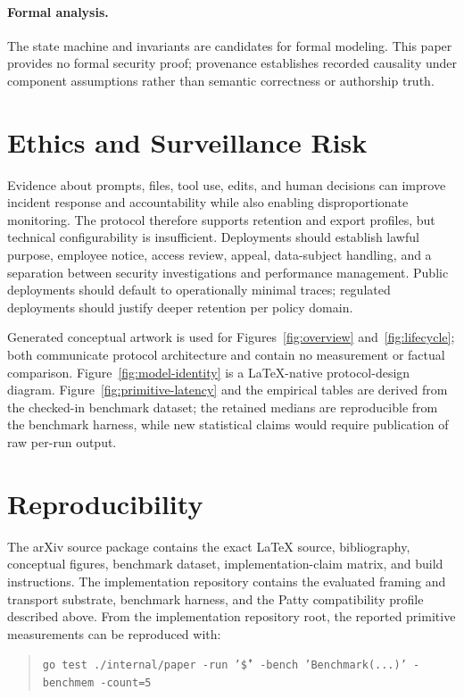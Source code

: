 \documentclass[10pt]{article}
\begin{document}
\paragraph{Formal analysis.}
The state machine and invariants are candidates for formal modeling. This paper provides no formal security proof; provenance establishes recorded causality under component assumptions rather than semantic correctness or authorship truth.

\section{Ethics and Surveillance Risk}

Evidence about prompts, files, tool use, edits, and human decisions can improve incident response and accountability while also enabling disproportionate monitoring. The protocol therefore supports retention and export profiles, but technical configurability is insufficient. Deployments should establish lawful purpose, employee notice, access review, appeal, data-subject handling, and a separation between security investigations and performance management. Public deployments should default to operationally minimal traces; regulated deployments should justify deeper retention per policy domain.

Generated conceptual artwork is used for Figures~\ref{fig:overview} and~\ref{fig:lifecycle}; both communicate protocol architecture and contain no measurement or factual comparison. Figure~\ref{fig:model-identity} is a LaTeX-native protocol-design diagram. Figure~\ref{fig:primitive-latency} and the empirical tables are derived from the checked-in benchmark dataset; the retained medians are reproducible from the benchmark harness, while new statistical claims would require publication of raw per-run output.

\section{Reproducibility}

The arXiv source package contains the exact LaTeX source, bibliography, conceptual figures, benchmark dataset, implementation-claim matrix, and build instructions. The implementation repository contains the evaluated framing and transport substrate, benchmark harness, and the Patty compatibility profile described above. From the implementation repository root, the reported primitive measurements can be reproduced with:

\begin{quote}\small
\texttt{go test ./internal/paper -run '\^\$' -bench 'Benchmark(...)' -benchmem -count=5}
\end{quote}
\end{document}
